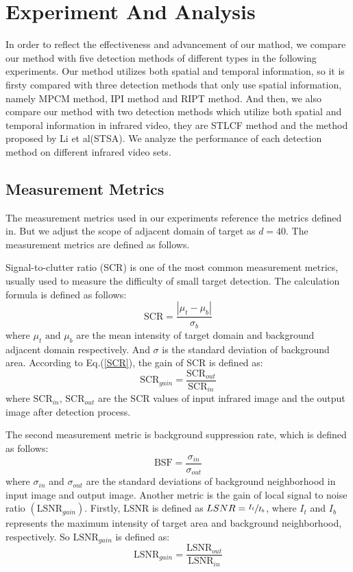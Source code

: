 \documentclass[journal]{IEEEtran}
\begin{document}
\section{Experiment And Analysis}
In order to reflect the effectiveness and advancement of our mathod, we compare our method with five detection methods of different types in the following experiments. Our method utilizes both spatial and temporal information, so it is firsty compared with three detection methods that only use spatial information, namely MPCM method\cite{wei2016multiscale}, IPI method\cite{gao2013infrared} and RIPT method\cite{dai2017reweighted}. And then, we also compare our method with two detection methods which utilize both spatial and temporal information in infrared video, they are STLCF method\cite{deng2016infrared} and the method proposed by Li et al\cite{li2016novel}(STSA). We analyze the performance of each detection method on different infrared video sets.

\subsection{Measurement Metrics}
The measurement metrics used in our experiments reference the metrics defined in\cite{gao2013infrared}\cite{dai2017reweighted}. But we adjust the scope of adjacent domain of target as $d=40$. The measurement metrics are defined as follows.

Signal-to-clutter ratio (SCR) is one of the most common measurement metrics, usually used to measure the difficulty of small target detection. The calculation formula is defined as follows:
\begin{equation}
  \mbox{SCR}=\frac{\left| \mu_t -\mu_b \right|}{\sigma_b}
  \label{SCR}
\end{equation}
where $\mu_t \text{ and }\mu_b$ are the mean intensity of target domain and background adjacent domain respectively. And $\sigma$ is the standard deviation of background area. According to Eq.(\ref{SCR}), the gain of SCR is defined as:
\begin{equation}
  \mbox{SCR}_{gain}=\frac{\mbox{SCR}_{out}}{\mbox{SCR}_{in}}
\end{equation}
where $\mbox{SCR}_{in}$, $\mbox{SCR}_{out}$ are the $\mbox{SCR}$ values of input infrared image and the output image after detection process.

The second measurement metric is background suppression rate, which is defined as follows:
\begin{equation}
  \mbox{BSF}=\frac{\sigma_{in}}{\sigma_{out}}
\end{equation}
where $\sigma _{in}$ and $\sigma _{out}$ are the standard deviations of background neighborhood in input image and output image. Another metric is the gain of local signal to noise ratio $(\mbox{LSNR}_{gain})$. Firstly, $\mbox{LSNR}$ is defined as $\relax{LSNR}=\sfrac{I_t}{I_b}$, where $I_t$ and $I_b$ represents the maximum intensity of target area and background neighborhood, respectively. So $\mbox{LSNR}_{gain}$ is defined as:
\begin{equation}
  \mbox{LSNR}_{gain}=\frac{\mbox{LSNR}_{out}}{\mbox{LSNR}_{in}}
\end{equation}
\end{document}
